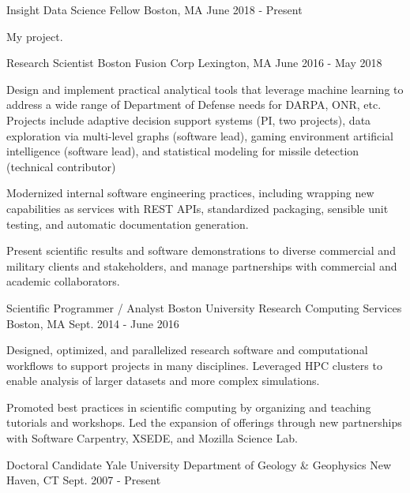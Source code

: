 \documentclass[11pt, letter]{awesome-cv}
\begin{document}
\begin{cventries}
  \cventry
    {Insight Data Science}
    {Fellow}
    {Boston, MA}
    {June 2018 - Present}
    {
    \begin{cvitems}
      \item{My project.}
    \end{cvitems}
    }
  \cventry
    {Research Scientist}
    {Boston Fusion Corp}
    {Lexington, MA}
    {June 2016 - May 2018}
    {
      \begin{cvitems}
        \item {Design and implement practical analytical tools that leverage machine learning to address a wide range of Department of Defense needs for DARPA, ONR, etc. Projects include adaptive decision support systems (PI, two projects), data exploration via multi-level graphs (software lead), gaming environment artificial intelligence (software lead), and statistical modeling for missile detection (technical contributor)}
        \item {Modernized internal software engineering practices, including wrapping new capabilities as services with REST APIs, standardized packaging, sensible unit testing, and automatic documentation generation.}
        \item {Present scientific results and software demonstrations to diverse commercial and military clients and stakeholders, and manage partnerships with commercial and academic collaborators.}
      \end{cvitems}
    }
  \cventry
    {Scientific Programmer / Analyst}
    {Boston University Research Computing Services}
    {Boston, MA}
    {Sept. 2014 - June 2016}
    {
      \begin{cvitems}
        \item {Designed, optimized, and parallelized research software and computational workflows to support projects in many disciplines. Leveraged HPC clusters to enable analysis of larger datasets and more complex simulations.}
        \item {Promoted best practices in scientific computing by organizing and teaching tutorials and workshops. Led the expansion of offerings through new partnerships with Software Carpentry, XSEDE, and Mozilla Science Lab.}
      \end{cvitems}
    }
  \cventry
    {Doctoral Candidate}
    {Yale University Department of Geology \& Geophysics}
    {New Haven, CT}
    {Sept. 2007 - Present}
    {
      \begin{cvitems}

\end{cvitems}}
\end{cventries}
\end{document}
